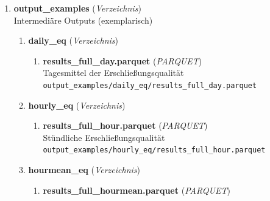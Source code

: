 \begin{enumerate}[label=\arabic*., leftmargin=*, itemsep=0.5em, topsep=0.3em]
\begin{enumerate}[label=\arabic{enumi}.\arabic*, leftmargin=*, itemsep=0.5em, topsep=0.3em]
\begin{enumerate}[label=\arabic{enumi}.\arabic{enumii}.\arabic*, leftmargin=*, itemsep=0.5em, topsep=0.3em]
\item \textbf{variability\_hourly\_20260518\_weekday\_20260504\_20260626} \textnormal{(\textit{Layer})}\\
Haltestellen mit Variabilitätswerten der BQ im und um das Untersuchungsgebiet, Grundlage für 10\_i2\_traveltimes
\end{enumerate}
\item \textbf{zHV\_aktuell\_csv.2026-05-21.zip} \textnormal{(\textit{ZIP})}\\
Auszug des zentralen Haltestellenverzeichnis vom 21.05.2026\\
\texttt{\small input/zHV\_aktuell\_csv.2026-05-21.zip}
\end{enumerate}
\item \textbf{output\_examples} \textnormal{(\textit{Verzeichnis})}\\
Intermediäre Outputs (exemplarisch)
\begin{enumerate}[label=\arabic{enumi}.\arabic*, leftmargin=*, itemsep=0.5em, topsep=0.3em]
\item \textbf{daily\_eq} \textnormal{(\textit{Verzeichnis})}
\begin{enumerate}[label=\arabic{enumi}.\arabic{enumii}.\arabic*, leftmargin=*, itemsep=0.5em, topsep=0.3em]
\item \textbf{results\_full\_day.parquet} \textnormal{(\textit{PARQUET})}\\
Tagesmittel der Erschließungsqualität\\
\texttt{\small output\_examples/daily\_eq/results\_full\_day.parquet}
\end{enumerate}
\item \textbf{hourly\_eq} \textnormal{(\textit{Verzeichnis})}
\begin{enumerate}[label=\arabic{enumi}.\arabic{enumii}.\arabic*, leftmargin=*, itemsep=0.5em, topsep=0.3em]
\item \textbf{results\_full\_hour.parquet} \textnormal{(\textit{PARQUET})}\\
Stündliche Erschließungsqualität\\
\texttt{\small output\_examples/hourly\_eq/results\_full\_hour.parquet}
\end{enumerate}
\item \textbf{hourmean\_eq} \textnormal{(\textit{Verzeichnis})}
\begin{enumerate}[label=\arabic{enumi}.\arabic{enumii}.\arabic*, leftmargin=*, itemsep=0.5em, topsep=0.3em]
\item \textbf{results\_full\_hourmean.parquet} \textnormal{(\textit{PARQUET})}\\

\end{enumerate}
\end{enumerate}
\end{enumerate}
